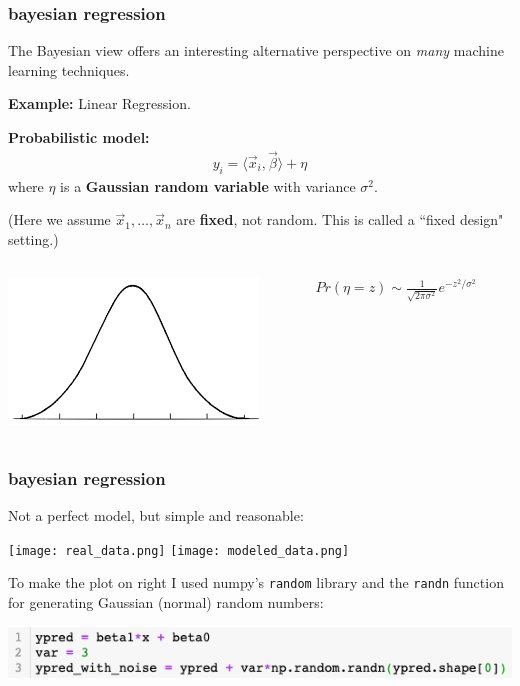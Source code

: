 \documentclass[handout,compress]{beamer}
\begin{document}
\begin{frame}
	\frametitle{bayesian regression}
	The Bayesian view offers an interesting alternative perspective on \emph{many} machine learning techniques. 
	
	\vspace{1em}
	\textbf{Example:} Linear Regression. 
	
	\textbf{Probabilistic model:}
	\begin{align*}
	 	y_i = \langle \vec{x}_i, \vec{\beta} \rangle+ \eta
	\end{align*}
	where $\eta$ is a \textbf{Gaussian random variable} with variance $\sigma^2$.
	
	(Here we assume $\vec{x}_1, \ldots, \vec{x}_n$ are \textbf{fixed}, not random. This is called a ``fixed design" setting.)
	\vspace{.5em}
	\begin{columns}
		\begin{column}{.5\textwidth}
				\hspace{2em}\includegraphics[width=.7\textwidth]{bell.png}
		\end{column}
		\begin{column}{.5\textwidth}
				$Pr(\eta = z) \sim \frac{1}{\sqrt{2\pi\sigma^2}} e^{-z^2/\sigma^2}$
		\end{column}
	\end{columns}
\end{frame}

\begin{frame}
	\frametitle{bayesian regression}
	Not a perfect model, but simple and reasonable:
	\begin{center}
		\texttt{[image: real\_data.png]} \texttt{[image: modeled\_data.png]}
		
		\small{To make the plot on right I used numpy's \texttt{random} library and the \texttt{randn} function for generating Gaussian (normal) random numbers:
			
		\includegraphics[width=.9\textwidth]{randn.png}}
	\end{center}
	
\end{frame}
\end{document}
